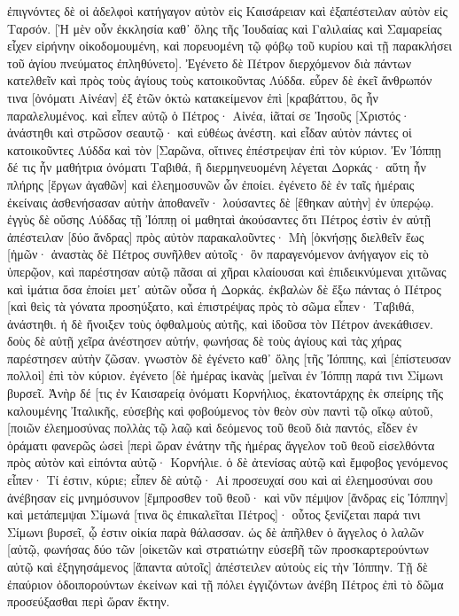 ἐπιγνόντες δὲ οἱ ἀδελφοὶ κατήγαγον αὐτὸν εἰς Καισάρειαν καὶ ἐξαπέστειλαν αὐτὸν εἰς Ταρσόν. 
[Ἡ μὲν οὖν ἐκκλησία καθ᾽ ὅλης τῆς Ἰουδαίας καὶ Γαλιλαίας καὶ Σαμαρείας εἶχεν εἰρήνην οἰκοδομουμένη, καὶ πορευομένη τῷ φόβῳ τοῦ κυρίου καὶ τῇ παρακλήσει τοῦ ἁγίου πνεύματος ἐπληθύνετο]. 
Ἐγένετο δὲ Πέτρον διερχόμενον διὰ πάντων κατελθεῖν καὶ πρὸς τοὺς ἁγίους τοὺς κατοικοῦντας Λύδδα. 
εὗρεν δὲ ἐκεῖ ἄνθρωπόν τινα [ὀνόματι Αἰνέαν] ἐξ ἐτῶν ὀκτὼ κατακείμενον ἐπὶ [κραβάττου, ὃς ἦν παραλελυμένος. 
καὶ εἶπεν αὐτῷ ὁ Πέτρος· Αἰνέα, ἰᾶταί σε Ἰησοῦς [Χριστός· ἀνάστηθι καὶ στρῶσον σεαυτῷ· καὶ εὐθέως ἀνέστη. 
καὶ εἶδαν αὐτὸν πάντες οἱ κατοικοῦντες Λύδδα καὶ τὸν [Σαρῶνα, οἵτινες ἐπέστρεψαν ἐπὶ τὸν κύριον. 
Ἐν Ἰόππῃ δέ τις ἦν μαθήτρια ὀνόματι Ταβιθά, ἣ διερμηνευομένη λέγεται Δορκάς· αὕτη ἦν πλήρης [ἔργων ἀγαθῶν] καὶ ἐλεημοσυνῶν ὧν ἐποίει. 
ἐγένετο δὲ ἐν ταῖς ἡμέραις ἐκείναις ἀσθενήσασαν αὐτὴν ἀποθανεῖν· λούσαντες δὲ [ἔθηκαν αὐτὴν] ἐν ὑπερῴῳ. 
ἐγγὺς δὲ οὔσης Λύδδας τῇ Ἰόππῃ οἱ μαθηταὶ ἀκούσαντες ὅτι Πέτρος ἐστὶν ἐν αὐτῇ ἀπέστειλαν [δύο ἄνδρας] πρὸς αὐτὸν παρακαλοῦντες· Μὴ [ὀκνήσῃς διελθεῖν ἕως [ἡμῶν· 
ἀναστὰς δὲ Πέτρος συνῆλθεν αὐτοῖς· ὃν παραγενόμενον ἀνήγαγον εἰς τὸ ὑπερῷον, καὶ παρέστησαν αὐτῷ πᾶσαι αἱ χῆραι κλαίουσαι καὶ ἐπιδεικνύμεναι χιτῶνας καὶ ἱμάτια ὅσα ἐποίει μετ᾽ αὐτῶν οὖσα ἡ Δορκάς. 
ἐκβαλὼν δὲ ἔξω πάντας ὁ Πέτρος [καὶ θεὶς τὰ γόνατα προσηύξατο, καὶ ἐπιστρέψας πρὸς τὸ σῶμα εἶπεν· Ταβιθά, ἀνάστηθι. ἡ δὲ ἤνοιξεν τοὺς ὀφθαλμοὺς αὐτῆς, καὶ ἰδοῦσα τὸν Πέτρον ἀνεκάθισεν. 
δοὺς δὲ αὐτῇ χεῖρα ἀνέστησεν αὐτήν, φωνήσας δὲ τοὺς ἁγίους καὶ τὰς χήρας παρέστησεν αὐτὴν ζῶσαν. 
γνωστὸν δὲ ἐγένετο καθ᾽ ὅλης [τῆς Ἰόππης, καὶ [ἐπίστευσαν πολλοὶ] ἐπὶ τὸν κύριον. 
ἐγένετο [δὲ ἡμέρας ἱκανὰς [μεῖναι ἐν Ἰόππῃ παρά τινι Σίμωνι βυρσεῖ. 
Ἀνὴρ δέ [τις ἐν Καισαρείᾳ ὀνόματι Κορνήλιος, ἑκατοντάρχης ἐκ σπείρης τῆς καλουμένης Ἰταλικῆς, 
εὐσεβὴς καὶ φοβούμενος τὸν θεὸν σὺν παντὶ τῷ οἴκῳ αὐτοῦ, [ποιῶν ἐλεημοσύνας πολλὰς τῷ λαῷ καὶ δεόμενος τοῦ θεοῦ διὰ παντός, 
εἶδεν ἐν ὁράματι φανερῶς ὡσεὶ [περὶ ὥραν ἐνάτην τῆς ἡμέρας ἄγγελον τοῦ θεοῦ εἰσελθόντα πρὸς αὐτὸν καὶ εἰπόντα αὐτῷ· Κορνήλιε. 
ὁ δὲ ἀτενίσας αὐτῷ καὶ ἔμφοβος γενόμενος εἶπεν· Τί ἐστιν, κύριε; εἶπεν δὲ αὐτῷ· Αἱ προσευχαί σου καὶ αἱ ἐλεημοσύναι σου ἀνέβησαν εἰς μνημόσυνον [ἔμπροσθεν τοῦ θεοῦ· 
καὶ νῦν πέμψον [ἄνδρας εἰς Ἰόππην] καὶ μετάπεμψαι Σίμωνά [τινα ὃς ἐπικαλεῖται Πέτρος]· 
οὗτος ξενίζεται παρά τινι Σίμωνι βυρσεῖ, ᾧ ἐστιν οἰκία παρὰ θάλασσαν. 
ὡς δὲ ἀπῆλθεν ὁ ἄγγελος ὁ λαλῶν [αὐτῷ, φωνήσας δύο τῶν [οἰκετῶν καὶ στρατιώτην εὐσεβῆ τῶν προσκαρτερούντων αὐτῷ 
καὶ ἐξηγησάμενος [ἅπαντα αὐτοῖς] ἀπέστειλεν αὐτοὺς εἰς τὴν Ἰόππην. 
Τῇ δὲ ἐπαύριον ὁδοιπορούντων ἐκείνων καὶ τῇ πόλει ἐγγιζόντων ἀνέβη Πέτρος ἐπὶ τὸ δῶμα προσεύξασθαι περὶ ὥραν ἕκτην. 
